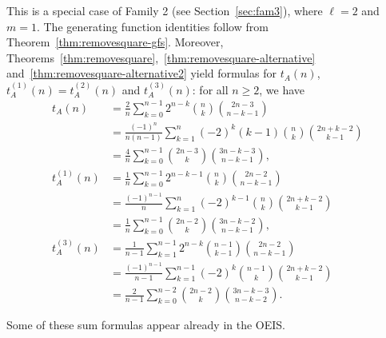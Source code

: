 \documentclass[12pt]{amsart}
\begin{document}
\begin{description}
\begin{itemize}
\end{itemize}
    \item[Discussion]
This is a special case of Family 2 (see Section~\ref{sec:fam3}), where $\ell = 2$ and $m=1$. The generating function identities follow from Theorem~\ref{thm:removesquare-gfs}. Moreover, Theorems~\ref{thm:removesquare},~\ref{thm:removesquare-alternative} and~\ref{thm:removesquare-alternative2} yield formulas for $t_A(n)$, $t_A^{(1)}(n) = t_A^{(2)}(n)$ and $t_A^{(3)}(n)$: for all $n \geq 2$, we have
\begin{align*}
  t_{A}(n) &= \frac{2}{n} \sum_{k=0}^{n-1} 2^{n-k}  \binom{n}{k} \binom{2n-3}{n-k-1} \\
  &= \frac{(-1)^n}{n(n-1)} \sum_{k=1}^{n} (-2)^k (k-1) \binom{n}{k} \binom{2n+k-2}{k-1} \\ 
  &= \frac{4}{n} \sum_{k=0}^{n-1} \binom{2n-3}{k} \binom{3n-k-3}{n-k-1}, \\
  t_{A}^{(1)}(n) &= \frac{1}{n} \sum_{k=0}^{n-1} 2^{n-k-1} \binom{n}{k} \binom{2n-2}{n-k-1} \\
  &= \frac{(-1)^{n-1}}{n} \sum_{k=1}^{n} (-2)^{k-1} \binom{n}{k} \binom{2n+k-2}{k-1} \\
  &= \frac{1}{n} \sum_{k=0}^{n-1} \binom{2n-2}{k} \binom{3n-k-2}{n-k-1}, \\
  t_{A}^{(3)}(n) &= \frac{1}{n-1} \sum_{k=1}^{n-1} 2^{n-k} \binom{n-1}{k-1} \binom{2n-2}{n-k-1}  \\
  &= \frac{(-1)^{n-1}}{n-1} \sum_{k=1}^{n-1} (-2)^k \binom{n-1}{k} \binom{2n+k-2}{k-1} \\
  &= \frac{2}{n-1} \sum_{k=0}^{n-2} \binom{2n-2}{k} \binom{3n-k-3}{n-k-2}.
\end{align*}

Some of these sum formulas appear already in the OEIS.

\end{description}
\end{document}
